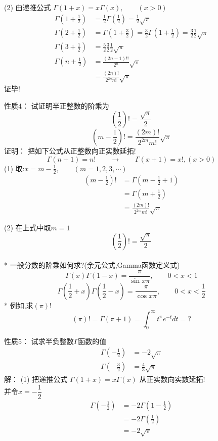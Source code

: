 	  {}
	  (2) 由递推公式 $\Gamma(1+x)=x \Gamma(x) ,\qquad (x>0)$\\
	  \[
	\begin{aligned}
		\Gamma(1+\frac{1}{2})&= \frac{1}{2} \Gamma(\frac{1}{2}) =\frac{1}{2} \sqrt{\pi}\\
		\Gamma(2+\frac{1}{2})&= \Gamma(1+\frac{3}{2})=\frac{3}{2} \Gamma(1+\frac{1}{2}) = \frac{3}{2}\frac{1}{2}\sqrt{\pi}\\
		\Gamma(3+\frac{1}{2})& = \frac{5}{2} \frac{3}{2}\frac{1}{2}\sqrt{\pi}\\
		\Gamma(n+\frac{1}{2})& = \frac{(2n-1)!!}{2^n}\sqrt{\pi}\\
		 & = \frac{(2n)!}{2^{2n} n!}\sqrt{\pi}
	\end{aligned} 
	  \]
	证毕!



	{\alert{性质4：}} 试证明半正整数的阶乘为
	\[(\frac{1}{2})! =  \frac{\sqrt{\pi}}{2}\]
	\[ (m-\frac{1}{2})! =\frac{(2m)!}{2^{2m} m!}\sqrt{\pi} \]
	{\alert{证明：}} 把如下公式从正整数向正实数延拓!
	\[\Gamma(n+1)=n!\qquad \to \qquad \Gamma(x+1)=x!, (x>0)\]
	(1) 取:$x=m-\frac{1}{2}, \qquad (m=1,2,3, \cdots )$
	\[ \begin{aligned}
		(m-\frac{1}{2})! &= \Gamma (m-\frac{1}{2}+1) \\
						 &= \Gamma (m+\frac{1}{2}) \\
						 & = \frac{(2m)!}{2^{2m} m!}\sqrt{\pi} 
	\end{aligned} \]



	(2) 在上式中取$m=1$
	\[(\frac{1}{2})! =  \frac{\sqrt{\pi}}{2} \]
	~~ \\ \vspace{1em}
* 一般分数的阶乘如何求?(余元公式,Gamma函数定义式)
\[ \Gamma(x)  \Gamma(1-x) =\frac{\pi}{\sin x \pi}, \qquad  0<x<1 \]
\[ \Gamma(\frac{1}{2}+x)  \Gamma(\frac{1}{2}-x) =\frac{\pi}{\cos x \pi}, \qquad  0<x<\frac{1}{2} \]
 * 例如,求$(\pi) !$ 
 \[ (\pi)! = \Gamma(\pi +1 ) = \int_{0}^{\infty} t^{\pi} e^{-t} dt =? \]



	{\alert{性质5：}} 试求半负整数$\Gamma$函数的值
	\begin{equation*}
		\begin{split}
		\Gamma(-\frac{1}{2}) &=-2\sqrt{\pi} \\ 
		\Gamma(-\frac{3}{2}) &=\frac{4}{3}\sqrt{\pi}
		\end{split}	
	\end{equation*}	
	{\alert{解：}} (1) 把递推公式 $\Gamma(1+x)=x \Gamma(x)$ 从正实数向实数延拓! \\
	并令$x=-\dfrac{1}{2}$\\
	\[
	\begin{aligned}
		 \Gamma(-\frac{1}{2})&= -2 \Gamma(1-\frac{1}{2})\\
		 &=-2 \Gamma(\frac{1}{2})\\
		 &=-2 \sqrt{\pi}
	\end{aligned}	
	\]



